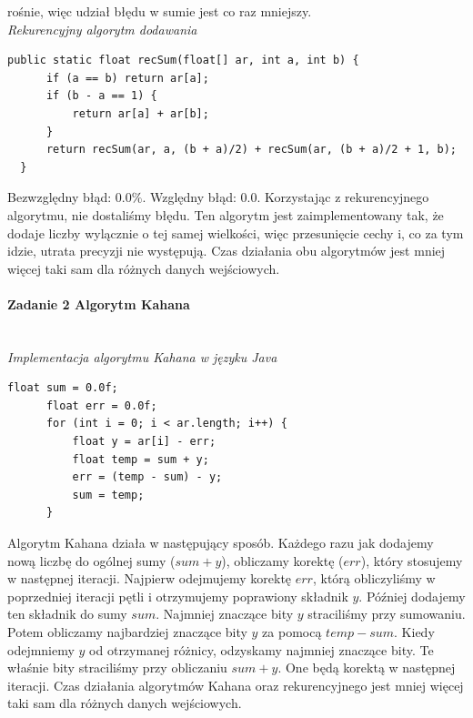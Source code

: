 \documentclass[12pt,a4paper]{article}
\begin{document}
  rośnie, więc udział błędu w sumie jest co raz mniejszy.\vspace{3mm}\\
  \emph{Rekurencyjny algorytm dodawania}
  \begin{Verbatim}[fontsize=\footnotesize]
  public static float recSum(float[] ar, int a, int b) {
      if (a == b) return ar[a];
      if (b - a == 1) {
          return ar[a] + ar[b];
      }
      return recSum(ar, a, (b + a)/2) + recSum(ar, (b + a)/2 + 1, b);
  }
  \end{Verbatim}
  Bezwzględny błąd: $ 0.0 \% $. \newline
  Względny błąd: $ 0.0 $. \newline
  Korzystając z rekurencyjnego algorytmu, nie dostaliśmy błędu. Ten algorytm
  jest zaimplementowany tak, że dodaje liczby wylącznie o tej samej wielkości,
  więc przesunięcie cechy i, co za tym idzie, utrata precyzji nie występują.
  \newline
  Czas działania obu algorytmów jest mniej więcej taki sam dla różnych danych
  wejściowych.
  \paragraph{Zadanie 2 Algorytm Kahana}\mbox{}\vspace{3mm}\\
  \emph{Implementacja algorytmu Kahana w języku Java}
  \begin{Verbatim}[fontsize=\footnotesize]
      float sum = 0.0f;
      float err = 0.0f;
      for (int i = 0; i < ar.length; i++) {
          float y = ar[i] - err;
          float temp = sum + y;
          err = (temp - sum) - y;
          sum = temp;
      }
  \end{Verbatim}
  Algorytm Kahana działa w następujący sposób. Każdego razu jak dodajemy
  nową liczbę do ogólnej sumy ($sum + y$), obliczamy korektę ($err$),
  który stosujemy w następnej iteracji. Najpierw odejmujemy korektę $err$,
  którą obliczyliśmy w poprzedniej iteracji pętli i otrzymujemy poprawiony
  składnik $y$. Później dodajemy ten składnik do sumy $sum$. Najmniej znaczące
  bity $y$ straciliśmy przy sumowaniu. Potem obliczamy najbardziej znaczące
  bity $y$ za pomocą $temp - sum$. Kiedy odejmniemy $y$ od otrzymanej różnicy,
  odzyskamy najmniej znaczące bity. Te właśnie bity straciliśmy przy obliczaniu
  $sum + y$. One będą korektą w następnej iteracji. \newline
  Czas działania algorytmów Kahana oraz rekurencyjnego jest mniej więcej taki
  sam dla różnych danych wejściowych.
\end{document}
